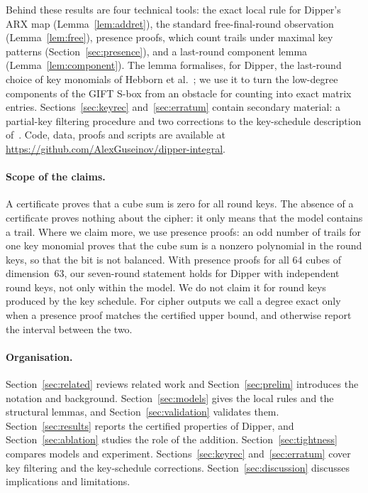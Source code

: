 \documentclass[pdflatex,sn-mathphys-num]{sn-jnl}
\theoremstyle{thmstyleone}
\theoremstyle{thmstylethree}
\theoremstyle{thmstyletwo}
\newcommand{\repo}{\url{https://github.com/AlexGuseinov/dipper-integral}}
\begin{document}
Behind these results are four technical tools: the exact local rule for Dipper's ARX map (Lemma~\ref{lem:addret}), the standard free-final-round observation (Lemma~\ref{lem:free}), presence proofs, which count trails under maximal key patterns (Section~\ref{sec:presence}), and a last-round component lemma (Lemma~\ref{lem:component}). The lemma formalises, for Dipper, the last-round choice of key monomials of Hebborn et al.~\cite{hebborn2021}; we use it to turn the low-degree components of the GIFT S-box from an obstacle for counting into exact matrix entries. Sections~\ref{sec:keyrec} and~\ref{sec:erratum} contain secondary material: a partial-key filtering procedure and two corrections to the key-schedule description of~\cite{dipper2026}. Code, data, proofs and scripts are available at \repo{}.

\paragraph{Scope of the claims.} A certificate proves that a cube sum is zero for all round keys. The absence of a certificate proves nothing about the cipher: it only means that the model contains a trail. Where we claim more, we use presence proofs: an odd number of trails for one key monomial proves that the cube sum is a nonzero polynomial in the round keys, so that the bit is not balanced. With presence proofs for all 64 cubes of dimension~63, our seven-round statement holds for Dipper with independent round keys, not only within the model. We do not claim it for round keys produced by the key schedule. For cipher outputs we call a degree exact only when a presence proof matches the certified upper bound, and otherwise report the interval between the two.

\paragraph{Organisation.} Section~\ref{sec:related} reviews related work and Section~\ref{sec:prelim} introduces the notation and background. Section~\ref{sec:models} gives the local rules and the structural lemmas, and Section~\ref{sec:validation} validates them. Section~\ref{sec:results} reports the certified properties of Dipper, and Section~\ref{sec:ablation} studies the role of the addition. Section~\ref{sec:tightness} compares models and experiment. Sections~\ref{sec:keyrec} and~\ref{sec:erratum} cover key filtering and the key-schedule corrections. Section~\ref{sec:discussion} discusses implications and limitations.
\end{document}
